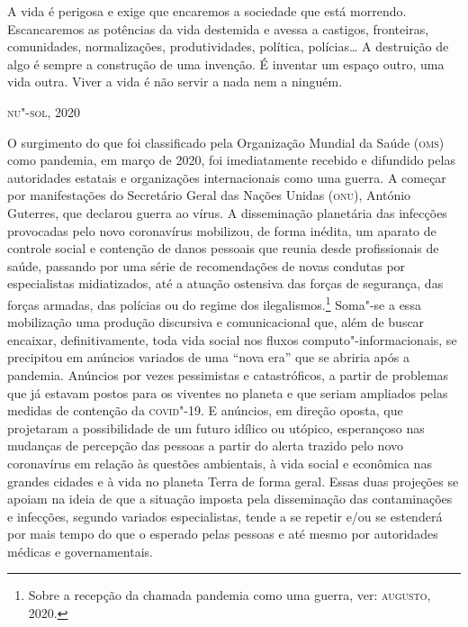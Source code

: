 
\epigraph{A vida é perigosa e exige que encaremos a sociedade que está
morrendo. Escancaremos as potências da vida destemida e avessa a
castigos, fronteiras, comunidades, normalizações, produtividades,
política, polícias\ldots{} A destruição de algo é sempre a construção de
uma invenção. É inventar um espaço outro, uma vida outra. Viver a vida é
não servir a nada nem a ninguém.}{\textsc{nu"-sol}, 2020}

\noindent{}O surgimento do que foi classificado pela Organização Mundial da Saúde
(\textsc{oms}) como pandemia, em março de 2020, foi imediatamente recebido e
difundido pelas autoridades estatais e organizações internacionais como
uma guerra. A começar por manifestações do Secretário Geral das Nações
Unidas (\textsc{onu}), António Guterres, que declarou guerra ao vírus. A
disseminação planetária das infecções provocadas pelo novo coronavírus
mobilizou, de forma inédita, um aparato de controle social e contenção
de danos pessoais que reunia desde profissionais de saúde, passando por
uma série de recomendações de novas condutas por especialistas
midiatizados, até a atuação ostensiva das forças de segurança, das
forças armadas, das polícias ou do regime dos ilegalismos.\footnote{Sobre
  a recepção da chamada pandemia como uma guerra, ver: \textsc{augusto}, 2020.}
Soma"-se a essa mobilização uma produção discursiva e comunicacional que,
além de buscar encaixar, definitivamente, toda vida social nos fluxos
computo"-informacionais, se precipitou em anúncios variados de uma ``nova
era'' que se abriria após a pandemia. Anúncios por vezes pessimistas e
catastróficos, a partir de problemas que já estavam postos para os
viventes no planeta e que seriam ampliados pelas medidas de contenção da
\textsc{covid}"-19. E anúncios, em direção oposta, que projetaram a possibilidade
de um futuro idílico ou utópico, esperançoso nas mudanças de percepção
das pessoas a partir do alerta trazido pelo novo coronavírus em relação
às questões ambientais, à vida social e econômica nas grandes cidades e
à vida no planeta Terra de forma geral. Essas duas projeções se apoiam
na ideia de que a situação imposta pela disseminação das contaminações e
infecções, segundo variados especialistas, tende a se repetir e/ou se
estenderá por mais tempo do que o esperado pelas pessoas e até mesmo por
autoridades médicas e governamentais.

